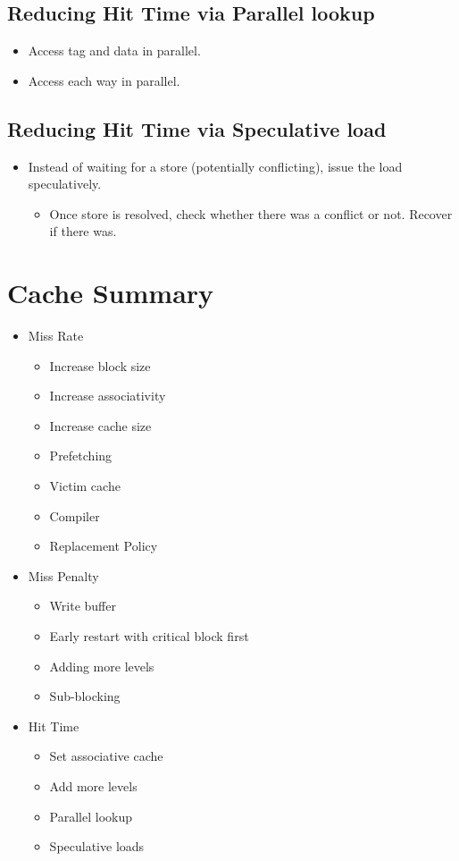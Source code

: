 \documentclass[10pt]{article}
\begin{document}
\subsection*{Reducing Hit Time via Parallel lookup}
\begin{itemize}
    \item Access tag and data in parallel.
    \item Access each way in parallel.
\end{itemize}

\subsection*{Reducing Hit Time via Speculative load}
\begin{itemize}
    \item Instead of waiting for a store (potentially conflicting), issue the load speculatively.
    \begin{itemize}
        \item Once store is resolved, check whether there was a conflict or not.  Recover if there was.
    \end{itemize}
\end{itemize}
\section*{Cache Summary}
\begin{itemize}
    \item Miss Rate
    \begin{itemize}
        \item Increase block size
        \item Increase associativity
        \item Increase cache size
        \item Prefetching
        \item Victim cache
        \item Compiler
        \item Replacement Policy
    \end{itemize}
    \item Miss Penalty
    \begin{itemize}
        \item Write buffer
        \item Early restart with critical block first
        \item Adding more levels
        \item Sub-blocking
    \end{itemize}
    \item Hit Time
    \begin{itemize}
        \item Set associative cache
        \item Add more levels
        \item Parallel lookup
        \item Speculative loads
    \end{itemize}
\end{itemize}
\end{document}
